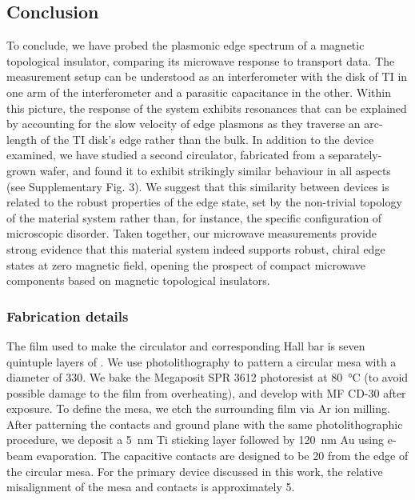\subsection{Conclusion}
To conclude, we have probed the plasmonic edge spectrum of a magnetic topological insulator, comparing its microwave response to transport data. The measurement setup can be understood as an interferometer with the disk of TI in one arm of the interferometer and a parasitic capacitance in the other. Within this picture, the response of the system exhibits resonances that can be explained by accounting for the slow velocity of edge plasmons as they traverse an arc-length of the TI disk's edge rather than the bulk. In addition to the device examined, we have studied a second circulator, fabricated from a separately-grown wafer, and found it to exhibit strikingly similar behaviour in all aspects (see Supplementary Fig. 3). We suggest that this similarity between devices is related to the robust properties of the edge state, set by the non-trivial topology of the material system rather than, for instance, the specific configuration of microscopic disorder. Taken together, our microwave measurements provide strong evidence that this material system indeed supports robust, chiral edge states at zero magnetic field, opening the prospect of compact microwave components based on magnetic topological insulators.

\subsubsection{Fabrication details}
The film used to make the circulator and corresponding Hall bar is seven quintuple layers of . We use photolithography to pattern a circular mesa with a diameter of \SI{330}{\micron}. We bake the Megaposit SPR 3612 photoresist at \SI{80}{\celsius} (to avoid possible damage to the film from overheating), and develop with MF CD-30 after exposure. To define the mesa, we etch the surrounding film via Ar ion milling. After patterning the contacts and ground plane with the same photolithographic procedure, we deposit a \SI{5}{\nano\meter} Ti sticking layer followed by \SI{120}{\nano\meter} Au using e-beam evaporation. The capacitive contacts are designed to be \SI{20}{\micron} from the edge of the circular mesa. For the primary device discussed in this work, the relative misalignment of the mesa and contacts is approximately \SI{5}{\micron}.

